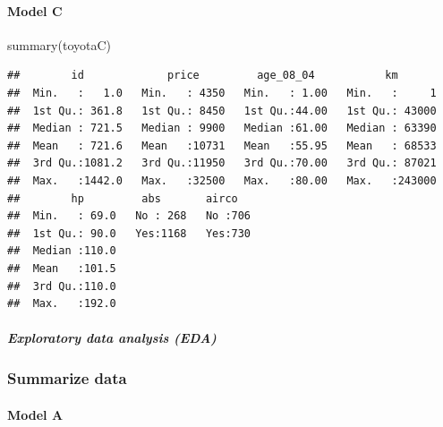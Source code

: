 \documentclass[
]{article}
\newenvironment{Shaded}{\begin{snugshade}}{\end{snugshade}}
\newcommand{\FunctionTok}[1]{\textcolor[rgb]{0.00,0.00,0.00}{#1}}
\newcommand{\NormalTok}[1]{#1}
\begin{document}
\hypertarget{model-c-3}{%
\paragraph{Model C}\label{model-c-3}}

\begin{Shaded}
\begin{Highlighting}[]
\FunctionTok{summary}\NormalTok{(toyotaC)}
\end{Highlighting}
\end{Shaded}

\begin{verbatim}
##        id             price         age_08_04           km        
##  Min.   :   1.0   Min.   : 4350   Min.   : 1.00   Min.   :     1  
##  1st Qu.: 361.8   1st Qu.: 8450   1st Qu.:44.00   1st Qu.: 43000  
##  Median : 721.5   Median : 9900   Median :61.00   Median : 63390  
##  Mean   : 721.6   Mean   :10731   Mean   :55.95   Mean   : 68533  
##  3rd Qu.:1081.2   3rd Qu.:11950   3rd Qu.:70.00   3rd Qu.: 87021  
##  Max.   :1442.0   Max.   :32500   Max.   :80.00   Max.   :243000  
##        hp         abs       airco    
##  Min.   : 69.0   No : 268   No :706  
##  1st Qu.: 90.0   Yes:1168   Yes:730  
##  Median :110.0                       
##  Mean   :101.5                       
##  3rd Qu.:110.0                       
##  Max.   :192.0
\end{verbatim}

\hypertarget{exploratory-data-analysis-eda}{%
\subparagraph{Exploratory data analysis
(EDA)}\label{exploratory-data-analysis-eda}}

\hypertarget{summarize-data}{%
\subsubsection{Summarize data}\label{summarize-data}}

\hypertarget{model-a-5}{%
\paragraph{Model A}\label{model-a-5}}
\end{document}
